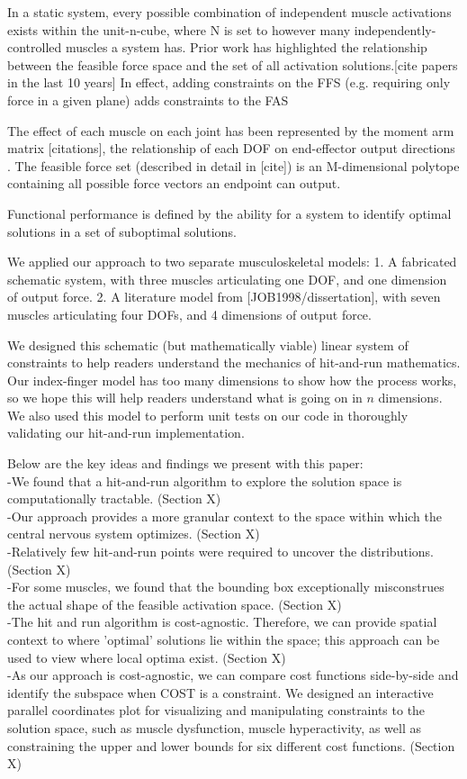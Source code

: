 In a static system, every possible combination of independent muscle activations exists within the unit-n-cube, where N is set to however many independently-controlled muscles a system has.
Prior work has highlighted the relationship between the feasible force space and the set of all activation solutions.[cite papers in the last 10 years]
In effect, adding constraints on the FFS (e.g. requiring only force in a given plane) adds constraints to the FAS

The effect of each muscle on each joint has been represented by the moment arm matrix [citations], the relationship of each DOF on end-effector output directions .
The feasible force set (described in detail in [cite]) is an M-dimensional polytope containing all possible force vectors an endpoint can output.

Functional performance is defined by the ability for a system to identify optimal solutions in a set of suboptimal solutions. 

We applied our approach to two separate musculoskeletal models:
1. A fabricated schematic system, with three muscles articulating one DOF, and one dimension of output force.
2. A literature model from [JOB1998/dissertation], with seven muscles articulating four DOFs, and 4 dimensions of output force.

We designed this schematic (but mathematically viable) linear system of constraints to help readers understand the mechanics of hit-and-run mathematics. Our index-finger model has too many dimensions to show how the process works, so we hope this will help readers understand what is going on in $n$ dimensions. We also used this model to perform unit tests on our code in thoroughly validating our hit-and-run implementation.

Below are the key ideas and findings we present with this paper:\\

-We found that a hit-and-run algorithm to explore the solution space is computationally tractable. (Section X)\\
-Our approach provides a more granular context to the space within which the central nervous system optimizes. (Section X)\\
-Relatively few hit-and-run points were required to uncover the distributions. (Section X)\\
-For some muscles, we found that the bounding box exceptionally misconstrues the actual shape of the feasible activation space. (Section X)\\
-The hit and run algorithm is cost-agnostic. Therefore, we can provide spatial context to where 'optimal' solutions lie within the space; this approach can be used to view where local optima exist. (Section X)\\
-As our approach is cost-agnostic, we can compare cost functions side-by-side and identify the subspace when COST is a constraint. We designed an interactive parallel coordinates plot for visualizing and manipulating constraints to the solution space, such as muscle dysfunction, muscle hyperactivity, as well as constraining the upper and lower bounds for six different cost functions. (Section X)\\

